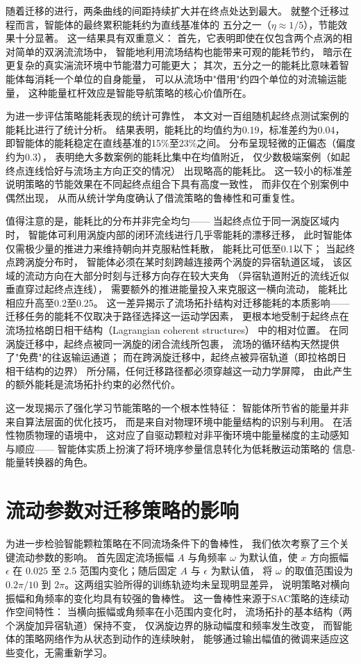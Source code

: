 随着迁移的进行，两条曲线的间距持续扩大并在终点处达到最大。
就整个迁移过程而言，智能体的最终累积能耗约为直线基准体的
五分之一（$\eta \approx 1/5$），节能效果十分显著。
这一结果具有双重意义：
首先，它表明即使在仅包含两个点涡的相对简单的双涡流流场中，
智能地利用流场结构也能带来可观的能耗节约，
暗示在更复杂的真实湍流环境中节能潜力可能更大；
其次，五分之一的能耗比意味着智能体每消耗一个单位的自身能量，
可以从流场中"借用"约四个单位的对流输运能量，
这种能量杠杆效应是智能导航策略的核心价值所在。

为进一步评估策略能耗表现的统计可靠性，
本文对一百组随机起终点测试案例的能耗比进行了统计分析。
结果表明，能耗比的均值约为0.19，标准差约为0.04，
即智能体的能耗稳定在直线基准的15\%至23\%之间。
分布呈现轻微的正偏态（偏度约为0.3），
表明绝大多数案例的能耗比集中在均值附近，
仅少数极端案例（如起终点连线恰好与流场主方向正交的情况）
出现略高的能耗比。
这一较小的标准差说明策略的节能效果在不同起终点组合下具有高度一致性，
而非仅在个别案例中偶然出现，
从而从统计学角度确认了借流策略的鲁棒性和可重复性。

值得注意的是，能耗比的分布并非完全均匀——
当起终点位于同一涡旋区域内时，
智能体可利用涡旋内部的闭环流线进行几乎零能耗的漂移迁移，
此时智能体仅需极少量的推进力来维持朝向并克服粘性耗散，
能耗比可低至0.1以下；
当起终点跨涡旋分布时，
智能体必须在某时刻跨越连接两个涡旋的异宿轨道区域，
该区域的流动方向在大部分时刻与迁移方向存在较大夹角
（异宿轨道附近的流线近似垂直穿过起终点连线），
需要额外的推进能量投入来克服这一横向流动，
能耗比相应升高至0.2至0.25。
这一差异揭示了流场拓扑结构对迁移能耗的本质影响——
迁移任务的能耗不仅取决于路径选择这一运动学因素，
更根本地受制于起终点在流场拉格朗日相干结构（Lagrangian coherent structures）
中的相对位置。
在同涡旋迁移中，起终点被同一涡旋的闭合流线所包裹，
流场的循环结构天然提供了"免费"的往返输运通道；
而在跨涡旋迁移中，起终点被异宿轨道（即拉格朗日相干结构的边界）
所分隔，任何迁移路径都必须穿越这一动力学屏障，
由此产生的额外能耗是流场拓扑约束的必然代价。

这一发现揭示了强化学习节能策略的一个根本性特征：
智能体所节省的能量并非来自算法层面的优化技巧，
而是来自对物理环境中能量结构的识别与利用。
在活性物质物理的语境中，
这对应了自驱动颗粒对非平衡环境中能量梯度的主动感知与顺应——
智能体实质上扮演了将环境序参量信息转化为低耗散运动策略的
信息-能量转换器的角色。

\section{流动参数对迁移策略的影响}

为进一步检验智能颗粒策略在不同流场条件下的鲁棒性，
我们依次考察了三个关键流动参数的影响。
首先固定流场振幅 $A$ 与角频率 $\omega$ 为默认值，使 $x$ 方向振幅 $\epsilon$ 在
 $0.025$ 至 $2.5$ 范围内变化；随后固定 $A$ 与 $\epsilon$ 为默认值，
 将 $\omega$ 的取值范围设为 $0.2\pi/10$ 到 $2\pi$。这两组实验所得的训练轨迹均未呈现明显差异，
 说明策略对横向振幅和角频率的变化均具有较强的鲁棒性。
 这一鲁棒性来源于SAC策略的连续动作空间特性：
 当横向振幅或角频率在小范围内变化时，
 流场拓扑的基本结构（两个涡旋加异宿轨道）保持不变，
 仅涡旋边界的脉动幅度和频率发生改变，
 而智能体的策略网络作为从状态到动作的连续映射，
 能够通过输出幅值的微调来适应这些变化，无需重新学习。

